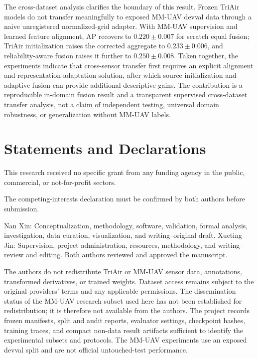 The cross-dataset analysis clarifies the boundary of this result. Frozen TriAir models do not transfer meaningfully to exposed MM-UAV devval data through a naive unregistered normalized-grid adapter. With MM-UAV supervision and learned feature alignment, AP recovers to $0.220\pm0.007$ for scratch equal fusion; TriAir initialization raises the corrected aggregate to $0.233\pm0.006$, and reliability-aware fusion raises it further to $0.250\pm0.008$. Taken together, the experiments indicate that cross-sensor transfer first requires an explicit alignment and representation-adaptation solution, after which source initialization and adaptive fusion can provide additional descriptive gains. The contribution is a reproducible in-domain fusion result and a transparent supervised cross-dataset transfer analysis, not a claim of independent testing, universal domain robustness, or generalization without MM-UAV labels.

\section*{Statements and Declarations}
This research received no specific grant from any funding agency in the public, commercial, or not-for-profit sectors.

The competing-interests declaration must be confirmed by both authors before submission.

Nan Xin: Conceptualization, methodology, software, validation, formal analysis, investigation, data curation, visualization, and writing--original draft. Xueting Jin: Supervision, project administration, resources, methodology, and writing--review and editing. Both authors reviewed and approved the manuscript.

The authors do not redistribute TriAir or MM-UAV sensor data, annotations, transformed derivatives, or trained weights. Dataset access remains subject to the original providers' terms and any applicable permissions. The dissemination status of the MM-UAV research subset used here has not been established for redistribution; it is therefore not available from the authors. The project records frozen manifests, split and audit reports, evaluator settings, checkpoint hashes, training traces, and compact non-data result artifacts sufficient to identify the experimental subsets and protocols. The MM-UAV experiments use an exposed devval split and are not official untouched-test performance.

